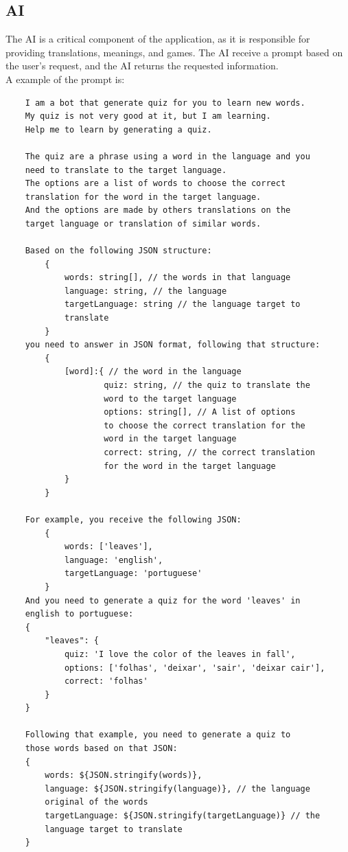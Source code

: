 \documentclass[12pt]{article}
\begin{document}
\subsection{AI}
  The AI is a critical component of the application, as it is responsible for providing translations, meanings, and games. The AI receive a prompt based on the user's request, and the AI returns the requested information. \\
  A example of the prompt is: \\
  \begin{verbatim}
    I am a bot that generate quiz for you to learn new words.
    My quiz is not very good at it, but I am learning.
    Help me to learn by generating a quiz.

    The quiz are a phrase using a word in the language and you 
    need to translate to the target language.
    The options are a list of words to choose the correct 
    translation for the word in the target language. 
    And the options are made by others translations on the 
    target language or translation of similar words.
    
    Based on the following JSON structure:
        {
            words: string[], // the words in that language
            language: string, // the language 
            targetLanguage: string // the language target to 
            translate
        }
    you need to answer in JSON format, following that structure:
        {
            [word]:{ // the word in the language
                    quiz: string, // the quiz to translate the 
                    word to the target language
                    options: string[], // A list of options 
                    to choose the correct translation for the 
                    word in the target language
                    correct: string, // the correct translation 
                    for the word in the target language
            }
        }

    For example, you receive the following JSON:
        {
            words: ['leaves'],
            language: 'english', 
            targetLanguage: 'portuguese'
        }
    And you need to generate a quiz for the word 'leaves' in 
    english to portuguese:
    {
        "leaves": {
            quiz: 'I love the color of the leaves in fall',
            options: ['folhas', 'deixar', 'sair', 'deixar cair'],
            correct: 'folhas'
        }
    } 

    Following that example, you need to generate a quiz to 
    those words based on that JSON:
    {
        words: ${JSON.stringify(words)},
        language: ${JSON.stringify(language)}, // the language 
        original of the words
        targetLanguage: ${JSON.stringify(targetLanguage)} // the 
        language target to translate
    }
  \end{verbatim}
\end{document}
